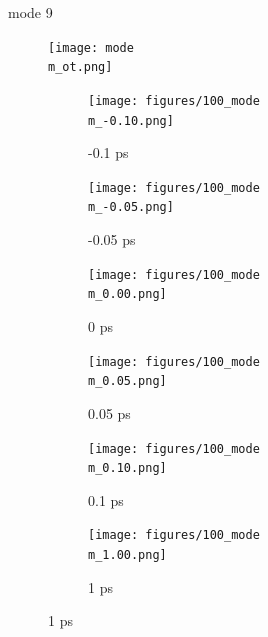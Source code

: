 \documentclass{beamer}
\newcommand\w{0.32}
\begin{document}
\renewcommand\m{9}
\begin{frame}{mode \m}
	\vspace{\vh mm}
\begin{figure}
	\centering
	\texttt{[image: mode\\m\_ot.png]}
\end{figure}
	\begin{figure}
		\centering
		\begin{subfigure}[b]{\w\textwidth}
			\centering
			\texttt{[image: figures/100\_mode\\m\_-0.10.png]}
			\caption{-0.1 ps}
		\end{subfigure}
		\begin{subfigure}[b]{\w\textwidth}
			\centering
			\texttt{[image: figures/100\_mode\\m\_-0.05.png]}
			\caption{-0.05 ps}
		\end{subfigure}
		\begin{subfigure}[b]{\w\textwidth}
			\centering
			\texttt{[image: figures/100\_mode\\m\_0.00.png]}
			\caption{0 ps}
		\end{subfigure}
		\begin{subfigure}[b]{\w\textwidth}
			\centering
			\texttt{[image: figures/100\_mode\\m\_0.05.png]}
			\caption{0.05 ps}
		\end{subfigure}
		\begin{subfigure}[b]{\w\textwidth}
			\centering
			\texttt{[image: figures/100\_mode\\m\_0.10.png]}
			\caption{0.1 ps}
		\end{subfigure}
		\begin{subfigure}[b]{\w\textwidth}
			\centering
			\texttt{[image: figures/100\_mode\\m\_1.00.png]}
			\caption{1 ps}
		\end{subfigure}
	\end{figure}
\end{frame}
\end{document}
